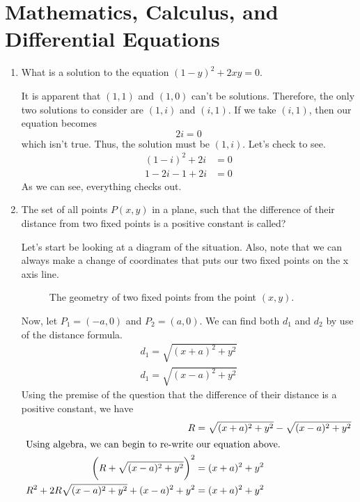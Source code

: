\section{Mathematics, Calculus, and Differential Equations}

\begin{enumerate}
\item
  What is a solution to the equation \((1 - y)^2 + 2xy = 0\).
  \par\smallskip
  It is apparent that \((1, 1)\) and \((1, 0)\) can't be solutions.
  Therefore, the only two solutions to consider are \((1, i)\) and \((i, 1)\).
  If we take \((i, 1)\), then our equation becomes
  \[
  2i = 0
  \]
  which isn't true.
  Thus, the solution must be \((1, i)\).
  Let's check to see.
  \begin{align*}
    (1 - i)^2 + 2i &= 0\\
    1 - 2i - 1 + 2i &= 0
  \end{align*}
  As we can see, everything checks out.
\item
  The set of all points \(P(x, y)\) in a plane, such that the difference of their
  distance from two fixed points is a positive constant is called?
  \par\smallskip
  Let's start be looking at a diagram of the situation.
  Also, note that we can always make a change of coordinates that puts our two
  fixed points on the x axis line.
  \begin{figure}[H]
    \centering
    
    \caption{The geometry of two fixed points from the point \((x, y)\).}
  \end{figure}
  Now, let \(P_1 = (-a, 0)\) and \(P_2 = (a, 0)\).
  We can find both \(d_1\) and \(d_2\) by use of the distance formula.
  \begin{gather*}
    d_1 = \sqrt{(x + a)^2 + y^2}\\
    d_1 = \sqrt{(x - a)^2 + y^2}
  \end{gather*}
  Using the premise of the question that the difference of their distance is a
  positive constant, we have
  \begin{align*}
    R &= \sqrt{(x + a)^2 + y^2} - \sqrt{(x - a)^2 + y^2}\\
    \intertext{Using algebra, we can begin to re-write our equation above.}
    \bigg(R + \sqrt{(x - a)^2 + y^2}\bigg)^2 &= (x + a)^2 + y^2\\
    R^2 + 2R\sqrt{(x - a)^2 + y^2} + (x - a)^2 + y^2 &= (x + a)^2 + y^2\\

\end{align*}
\end{enumerate}
